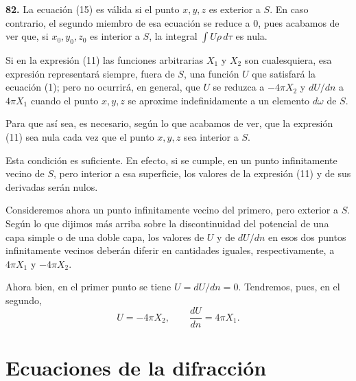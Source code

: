 \noindent\textbf{82.} La ecuación (15) es válida si el punto $x,y,z$ es
exterior a $S$. En caso contrario, el segundo miembro de esa ecuación se
reduce a $0$, pues acabamos de ver que, si $x_0,y_0,z_0$ es interior a
$S$, la integral $\int U\rho\,d\tau$ es nula.

Si en la expresión (11) las funciones arbitrarias $X_1$ y $X_2$ son
cualesquiera, esa expresión representará siempre, fuera de $S$, una
función $U$ que satisfará la ecuación (1); pero no ocurrirá, en general,
que $U$ se reduzca a $-4\pi X_2$ y $dU/dn$ a $4\pi X_1$ cuando el punto
$x,y,z$ se aproxime indefinidamente a un elemento $d\omega$ de $S$.

Para que así sea, es necesario, según lo que acabamos de ver, que la
expresión (11) sea nula cada vez que el punto $x,y,z$ sea interior a $S$.

Esta condición es suficiente. En efecto, si se cumple, en un punto
infinitamente vecino de $S$, pero interior a esa superficie, los valores
de la expresión (11) y de sus derivadas serán nulos.

Consideremos ahora un punto infinitamente vecino del primero, pero
exterior a $S$. Según lo que dijimos más arriba sobre la discontinuidad
del potencial de una capa simple o de una doble capa, los valores de $U$ y
de $dU/dn$ en esos dos puntos infinitamente vecinos deberán diferir en
cantidades iguales, respectivamente, a $4\pi X_1$ y $-4\pi X_2$.

Ahora bien, en el primer punto se tiene $U=dU/dn=0$. Tendremos, pues, en
el segundo,
\[
U=-4\pi X_2,\qquad \frac{dU}{dn}=4\pi X_1.
\]

\section{Ecuaciones de la difracción}

